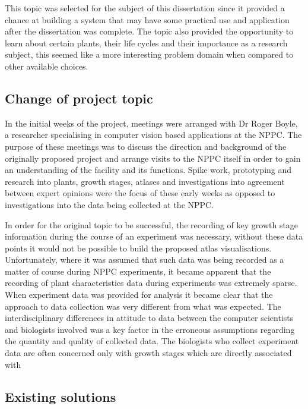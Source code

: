 This topic was selected for the subject of this dissertation since it provided a chance at building a system that may have some practical use and application after the dissertation was complete. The topic also provided the opportunity to learn about certain plants, their life cycles and their importance as a research subject, this seemed like a more interesting problem domain when compared to other available choices.

\subsection{Change of project topic}

In the initial weeks of the project, meetings were arranged with Dr Roger Boyle, a researcher specialising in computer vision based applications at the NPPC. The purpose of these meetings was to discuss the direction and background of the originally proposed project and arrange visits to the NPPC itself in order to gain an understanding of the facility and its functions. Spike work, prototyping and research into plants, growth stages, atlases and investigations into agreement between expert opinions \cite{williams_comparing_1976} were the focus of these early weeks as opposed to investigations into the data being collected at the NPPC.

 In order for the original topic to be successful, the recording of key growth stage information during the course of an experiment was necessary, without these data points it would not be possible to build the proposed atlas visualisations. Unfortunately, where it was assumed that such data was being recorded as a matter of course during NPPC experiments, it became apparent that the recording of plant characteristics data during experiments was extremely sparse. When experiment data was provided for analysis it became clear that the approach to data collection was very different from what was expected. The interdisciplinary differences in attitude to data between the computer scientists and biologists involved was a key factor in the erroneous assumptions regarding the quantity and quality of collected data. The biologists who collect experiment data are often concerned only with growth stages which are directly associated with 
 
  

\subsection{Existing solutions}

